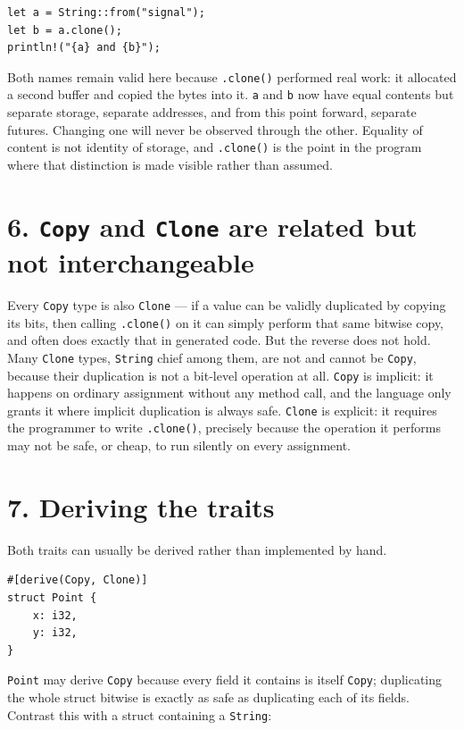 \documentclass[11pt]{book}
\begin{document}
\begin{lstlisting}
let a = String::from("signal");
let b = a.clone();
println!("{a} and {b}");
\end{lstlisting}

Both names remain valid here because \texttt{.clone()} performed real work: it allocated a second buffer and copied the bytes into it. \texttt{a} and \texttt{b} now have equal contents but separate storage, separate addresses, and from this point forward, separate futures. Changing one will never be observed through the other. Equality of content is not identity of storage, and \texttt{.clone()} is the point in the program where that distinction is made visible rather than assumed.

\section*{6. \texttt{Copy} and \texttt{Clone} are related but not interchangeable}

Every \texttt{Copy} type is also \texttt{Clone} --- if a value can be validly duplicated by copying its bits, then calling \texttt{.clone()} on it can simply perform that same bitwise copy, and often does exactly that in generated code. But the reverse does not hold. Many \texttt{Clone} types, \texttt{String} chief among them, are not and cannot be \texttt{Copy}, because their duplication is not a bit-level operation at all. \texttt{Copy} is implicit: it happens on ordinary assignment without any method call, and the language only grants it where implicit duplication is always safe. \texttt{Clone} is explicit: it requires the programmer to write \texttt{.clone()}, precisely because the operation it performs may not be safe, or cheap, to run silently on every assignment.

\section*{7. Deriving the traits}

Both traits can usually be derived rather than implemented by hand.

\begin{lstlisting}
#[derive(Copy, Clone)]
struct Point {
    x: i32,
    y: i32,
}
\end{lstlisting}

\texttt{Point} may derive \texttt{Copy} because every field it contains is itself \texttt{Copy}; duplicating the whole struct bitwise is exactly as safe as duplicating each of its fields. Contrast this with a struct containing a \texttt{String}:
\end{document}
